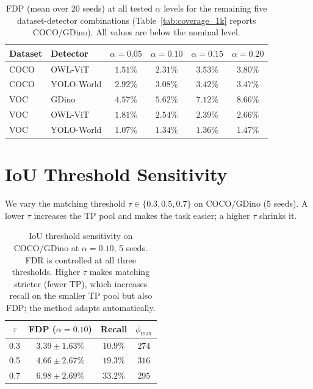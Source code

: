 \documentclass{article}
\theoremstyle{remark}
\newcommand{\1}{\mathbf{1}}
\begin{document}
\begin{table}[h]
\centering
\small
\begin{tabular*}{\linewidth}{@{\extracolsep{\fill}}llcccc@{}}
\toprule
Dataset & Detector & $\alpha=0.05$ & $\alpha=0.10$ & $\alpha=0.15$ & $\alpha=0.20$ \\
\midrule
COCO & OWL-ViT & $1.51\%$ & $2.31\%$ & $3.53\%$ & $3.80\%$ \\
COCO & YOLO-World & $2.92\%$ & $3.08\%$ & $3.42\%$ & $3.47\%$ \\
\midrule
VOC & GDino   & $4.57\%$ & $5.62\%$ & $7.12\%$ & $8.66\%$ \\
VOC & OWL-ViT & $1.81\%$ & $2.54\%$ & $2.39\%$ & $2.66\%$ \\
VOC & YOLO-World & $1.07\%$ & $1.34\%$ & $1.36\%$ & $1.47\%$ \\
\bottomrule
\end{tabular*}
\caption{FDP (mean over 20 seeds) at all tested $\alpha$ levels for the remaining
five dataset-detector combinations (Table~\ref{tab:coverage_1k} reports COCO/GDino).
All values are below the nominal level.}
\label{tab:sweep_app}
\end{table}

\section{IoU Threshold Sensitivity}
\label{app:iou_sensitivity}

We vary the matching threshold $\tau\in\{0.3, 0.5, 0.7\}$ on COCO/GDino
(5 seeds). A lower $\tau$ increases the TP pool and makes the task easier;
a higher $\tau$ shrinks it.

\begin{table}[h]
\centering
\small
\begin{tabular}{cccc}
\toprule
$\tau$ & FDP ($\alpha\!=\!0.10$) & Recall & $\phi_{\max}$ \\
\midrule
0.3 & $3.39 \pm 1.63\%$ & $10.9\%$ & $274$ \\
0.5 & $4.66 \pm 2.67\%$ & $19.3\%$ & $316$ \\
0.7 & $6.98 \pm 2.69\%$ & $33.2\%$ & $295$ \\
\bottomrule
\end{tabular}
\caption{IoU threshold sensitivity on COCO/GDino at $\alpha=0.10$, 5 seeds.
FDR is controlled at all three thresholds. Higher $\tau$ makes matching
stricter (fewer TP), which increases recall on the smaller TP pool but also
FDP; the method adapts automatically.}
\label{tab:iou_sensitivity}
\end{table}
\end{document}
